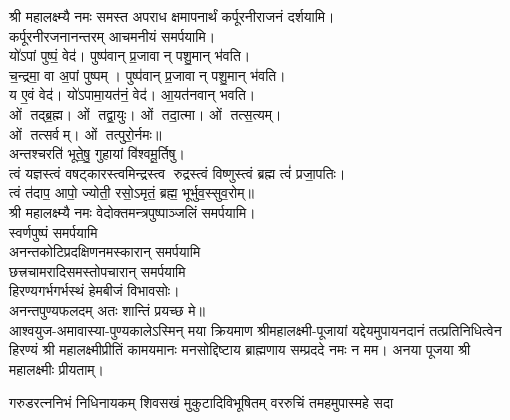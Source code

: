 श्री महालक्ष्म्यै नमः समस्त अपराध क्षमापनार्थं कर्पूरनीराजनं दर्शयामि।\\
कर्पूरनीरजनानन्तरम् आचमनीयं समर्पयामि।\\

 यो॑ऽपां पुष्पं॒ वेद॑। पुष्प॑वान् प्र॒जावान् पशु॒मान् भ॑वति।\\
च॒न्द्रमा॒ वा अ॒पां पुष्पम्। पुष्प॑वान् प्र॒जावान् पशु॒मान् भ॑वति।\\
य ए॒वं वेद॑। यो॑ऽपामा॒यत॑नं॒ वेद॑। आ॒यत॑नवान् भवति।\\

ओं तद्ब्र॒ह्म। ओं तद्वा॒युः। ओं तदा॒त्मा। ओं तत्स॒त्यम्‌।\\
ओं तत्सर्वम्‌। ओं तत्पुरो॒र्नमः॥\\

अन्तश्चरति॑ भूते॒षु॒ गुहायां वि॑श्वमू॒र्तिषु। \\
त्वं यज्ञस्त्वं वषट्कारस्त्वमिन्द्रस्त्व रुद्रस्त्वं विष्णुस्त्वं ब्रह्म त्वं॑ प्रजा॒पतिः। \\
त्वं त॑दाप॒ आपो॒ ज्योती॒ रसो॒ऽमृतं॒ ब्रह्म॒ भूर्भुव॒स्सुव॒रोम्‌॥\\

श्री महालक्ष्म्यै नमः वेदोक्तमन्त्रपुष्पाञ्जलिं समर्पयामि।\\

स्वर्णपुष्पं समर्पयामि\\
 
अनन्तकोटिप्रदक्षिणनमस्कारान् समर्पयामि\\

छत्त्रचामरादिसमस्तोपचारान् समर्पयामि\\

हिरण्यगर्भगर्भस्थं हेमबीजं विभावसोः।\\
अनन्तपुण्यफलदम् अतः शान्तिं प्रयच्छ मे॥\\

आश्वयुज-अमावास्या-पुण्यकालेऽस्मिन् मया क्रियमाण श्रीमहालक्ष्मी-पूजायां
यद्देयमुपायनदानं तत्प्रतिनिधित्वेन हिरण्यं श्री महालक्ष्मीप्रीतिं
कामयमानः मनसोद्दिष्टाय ब्राह्मणाय सम्प्रददे नमः न मम। 
अनया पूजया श्री महालक्ष्मीः प्रीयताम्। 






{गरुडरत्ननिभं निधिनायकम्}
{शिवसखं मुकुटादिविभूषितम्}
{वररुचिं तमहमुपास्महे सदा}

